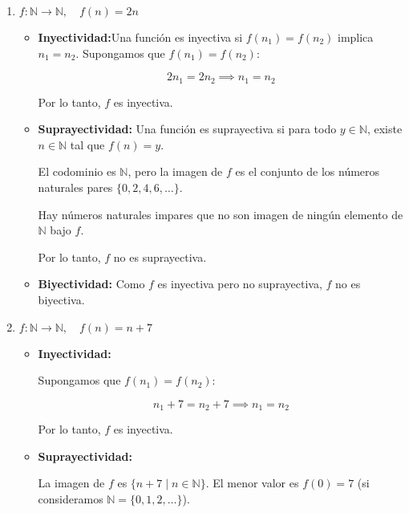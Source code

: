\begin{solution}
	\begin{enumerate}
		\item \( f : \mathbb{N} \rightarrow \mathbb{N}, \quad f(n) = 2n \)
		      \begin{itemize}
			      \item \textbf{Inyectividad:}Una función es inyectiva si \( f(n_1) = f(n_2) \) implica \( n_1 = n_2 \).
			            Supongamos que \( f(n_1) = f(n_2) \):

			            \[2n_1 = 2n_2 \implies n_1 = n_2\]

			            Por lo tanto, \( f \) es inyectiva.

			      \item \textbf{Suprayectividad:} Una función es suprayectiva si para todo \( y \in \mathbb{N} \), existe \( n \in \mathbb{N} \) tal que \( f(n) = y \).

			            El codominio es \( \mathbb{N} \), pero la imagen de \( f \) es el conjunto de los números naturales pares \( \{0, 2, 4, 6, \dots\} \).

			            Hay números naturales impares que no son imagen de ningún elemento de \( \mathbb{N} \) bajo \( f \).

			            Por lo tanto, \( f \) no es suprayectiva.

			      \item \textbf{Biyectividad:} Como \( f \) es inyectiva pero no suprayectiva, \( f \) no es biyectiva.
		      \end{itemize}

		\item \( f : \mathbb{N} \rightarrow \mathbb{N}, \quad f(n) = n + 7 \)
		      \begin{itemize}
			      \item \textbf{Inyectividad:}

			            Supongamos que \( f(n_1) = f(n_2) \):

			            \[
				            n_1 + 7 = n_2 + 7 \implies n_1 = n_2
			            \]

			            Por lo tanto, \( f \) es inyectiva.

			      \item \textbf{Suprayectividad:}

			            La imagen de \( f \) es \( \{ n + 7 \mid n \in \mathbb{N} \} \). El menor valor es \( f(0) = 7 \) (si consideramos \( \mathbb{N} = \{0, 1, 2, \dots\} \)).


\end{itemize}
\end{enumerate}
\end{solution}
